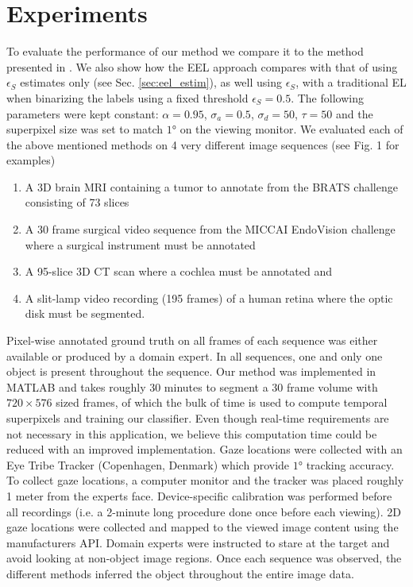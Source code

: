 \section{Experiments}
\label{sec:eel_exp}
To evaluate the performance of our method we compare it to the method presented in \cite{vilarino07}.
We also show how the EEL approach compares with that of using $\epsilon_{S}$ estimates only
(see Sec. \ref{sec:eel_estim}), as well using $\epsilon_{S}$, with a traditional EL when binarizing the labels using a fixed
threshold $\epsilon_{S}=0.5$.
The following parameters were kept constant: $\alpha=0.95$, $\sigma_{a}=0.5$, $\sigma_{d}=50$, $\tau = 50$ and the superpixel size was set to match $\ang{1}$ on the viewing monitor.
We evaluated each of the above mentioned methods on 4 very different image sequences (see
Fig. 1 for examples)

\begin{enumerate}
\item A 3D brain MRI containing a tumor to annotate from the BRATS
challenge \cite{BRATSChall} consisting of 73 slices
\item A 30 frame surgical video sequence from the MICCAI
EndoVision challenge \cite{endochal} where a surgical instrument must be annotated
\item A 95-slice 3D CT scan where a cochlea must be annotated and
\item A slit-lamp video recording (195 frames) of a human retina where the optic disk must be segmented.
\end{enumerate}

Pixel-wise annotated ground truth
on all frames of each sequence was either available or produced by a domain expert.
In all sequences, one and only one object is present throughout the sequence.
Our method was implemented in MATLAB and takes roughly 30 minutes to segment a
30 frame volume with $720 \times 576$ sized frames, of which the bulk of time is used to compute
temporal superpixels and training our classifier.
Even though real-time requirements are not necessary in this application, we believe this computation time could be reduced with an improved implementation.
Gaze locations were collected with an Eye Tribe Tracker (Copenhagen, Denmark) which provide
$\ang{1}$ tracking accuracy.
To collect gaze locations, a computer monitor and the tracker
was placed roughly 1 meter from the experts face.
Device-specific calibration was performed before all recordings (i.e. a 2-minute long procedure done once before each viewing).
2D gaze locations were collected and mapped to the viewed image content using the manufacturers API.
Domain experts were instructed to stare at the target and avoid looking at non-object image
regions.
Once each sequence was observed, the different methods inferred the object throughout
the entire image data.

